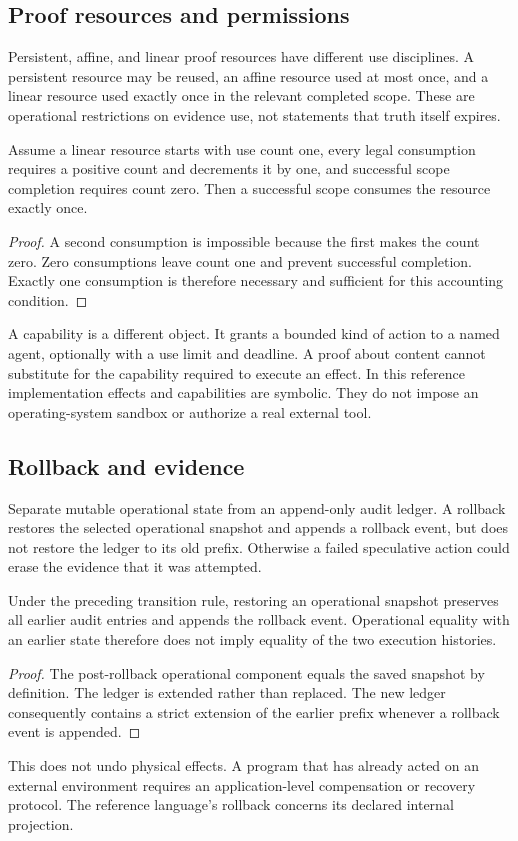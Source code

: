 \documentclass[11pt]{article}
\begin{document}
\subsection{Proof resources and permissions}
Persistent, affine, and linear proof resources have different use disciplines. A persistent resource may be reused, an affine resource used at most once, and a linear resource used exactly once in the relevant completed scope. These are operational restrictions on evidence use, not statements that truth itself expires.

\begin{proposition}
Assume a linear resource starts with use count one, every legal consumption requires a positive count and decrements it by one, and successful scope completion requires count zero. Then a successful scope consumes the resource exactly once.
\end{proposition}
\begin{proof}
A second consumption is impossible because the first makes the count zero. Zero consumptions leave count one and prevent successful completion. Exactly one consumption is therefore necessary and sufficient for this accounting condition.
\end{proof}
A capability is a different object. It grants a bounded kind of action to a named agent, optionally with a use limit and deadline. A proof about content cannot substitute for the capability required to execute an effect. In this reference implementation effects and capabilities are symbolic. They do not impose an operating-system sandbox or authorize a real external tool.

\subsection{Rollback and evidence}
Separate mutable operational state from an append-only audit ledger. A rollback restores the selected operational snapshot and appends a rollback event, but does not restore the ledger to its old prefix. Otherwise a failed speculative action could erase the evidence that it was attempted.

\begin{proposition}
Under the preceding transition rule, restoring an operational snapshot preserves all earlier audit entries and appends the rollback event. Operational equality with an earlier state therefore does not imply equality of the two execution histories.
\end{proposition}
\begin{proof}
The post-rollback operational component equals the saved snapshot by definition. The ledger is extended rather than replaced. The new ledger consequently contains a strict extension of the earlier prefix whenever a rollback event is appended.
\end{proof}
This does not undo physical effects. A program that has already acted on an external environment requires an application-level compensation or recovery protocol. The reference language's rollback concerns its declared internal projection.
\end{document}
